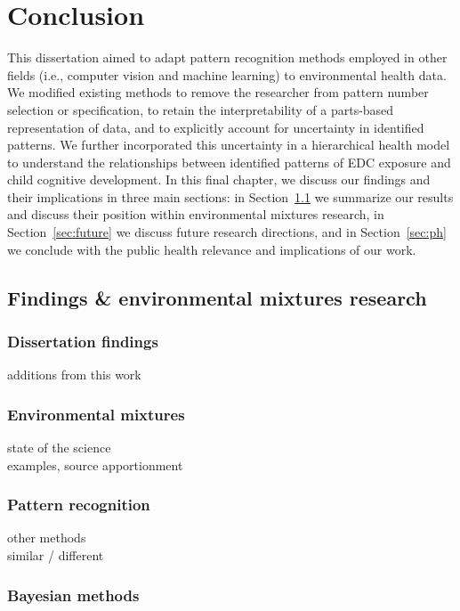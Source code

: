 \chapter{Conclusion}\label{sec:conclusion}
\clearpage

This dissertation aimed to adapt pattern recognition methods employed in other fields (i.e., computer vision and machine learning) to environmental health data. We modified existing methods to remove the researcher from pattern number selection or specification, to retain the interpretability of a parts-based representation of data, and to explicitly account for uncertainty in identified patterns. We further incorporated this uncertainty in a hierarchical health model to understand the relationships between identified patterns of EDC exposure and child cognitive development. In this final chapter, we discuss our findings and their implications in three main sections: in Section~\ref{sec:summarize} we summarize our results and discuss their position within environmental mixtures research, in Section~\ref{sec:future} we discuss future research directions, and in Section~\ref{sec:ph} we conclude with the public health relevance and implications of our work.

\section{Findings \& environmental mixtures research}\label{sec:summarize}

\subsection{Dissertation findings}\label{sec:findings}
additions from this work

\subsection{Environmental mixtures}\label{sec:mixtures}
state of the science \\
examples, source apportionment

\subsection{Pattern recognition}\label{sec:patrec}
other methods \\
similar / different \\

\subsection{Bayesian methods}\label{sec:bayes}


